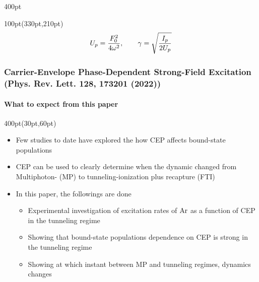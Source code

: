 \begin{frame}
\begin{textblock*}{400pt}
\begin{itemize}
\begin{itemize}
\end{itemize}

\end{itemize}
\end{textblock*}


\begin{textblock*}{100pt}(330pt,210pt)
\begin{align}
\footnotesize
U_p = \frac{F_0^2}{4\omega^2}, \hspace{20pt} 
\gamma = \sqrt{\frac{I_p}{2U_p}}\nonumber
\end{align}
\end{textblock*}

\end{frame}
%
%
%
\begin{frame}
\frametitle{Carrier-Envelope Phase-Dependent Strong-Field Excitation \\
\small (Phys. Rev. Lett. \textbf{128}, 173201 (2022))}
\framesubtitle{What to expect from this paper}

\small
\begin{textblock*}{400pt}(30pt,60pt)
\begin{itemize}
\item Few studies to date have explored the how CEP affects 
bound-state populations
\item CEP can be used to clearly determine when the dynamic changed from 
Multiphoton- (MP) to tunneling-ionization plus recapture (FTI)
\vspace{10pt}
\item In this paper, the followings are done
\begin{itemize}
\footnotesize
\item[$\bullet$] Experimental investigation of excitation rates of $\rm Ar$
as a function of CEP in the tunneling regime
\item[$\bullet$] Showing that bound-state populations dependence on CEP 
is strong in the tunneling regime
\item[$\bullet$] Showing at which instant between MP and tunneling regimes,
dynamics changes
\end{itemize}
\end{itemize}

\end{textblock*}

\end{frame}


